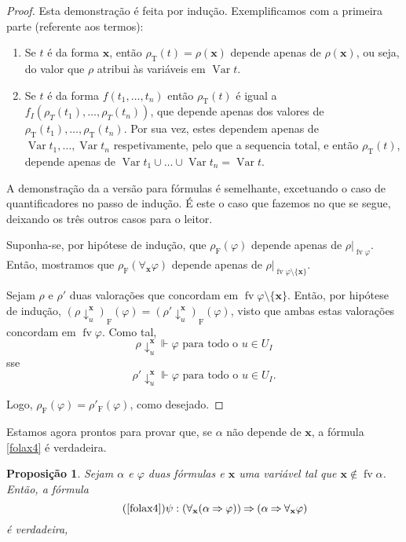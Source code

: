 \documentclass{report}
\newtheorem{prop}{Proposição}
\theoremstyle{definition}
\theoremstyle{remark}
\renewcommand{\bf}[1]{\mathbf{#1}}
\newcommand{\F}{\mathrm{F}}
\newcommand{\T}{\mathrm{T}}
\DeclareMathOperator{\var}{Var}
\DeclareMathOperator{\fv}{fv}
\newcommand{\imply}{\mathbin{\Rightarrow}}
\begin{document}
	\begin{proof}
	Esta demonstração é feita por indução. Exemplificamos com a primeira parte (referente aos termos):
	
	\begin{enumerate}
	\item Se $t$ é da forma $\bf x$, então $\rho_\T(t) = \rho(\bf x)$ depende apenas de $\rho(\bf x)$, ou seja, do valor que $\rho$ atribui às variáveis em $\var t$.
	
	\item Se $t$ é da forma $f(t_1, \dots, t_n)$ então $\rho_\T(t)$ é igual a $f_I(\rho_T(t_1), \dots, \rho_T(t_n))$, que depende apenas dos valores de $\rho_\T(t_1), \dots, \rho_\T(t_n)$. Por sua vez, estes dependem apenas de $\var t_1, \dots, \var t_n$ respetivamente, pelo que a sequencia total, e então $\rho_\T(t)$, depende apenas de $\var t_1 \cup \dots \cup \var t_n = \var t$.
	\end{enumerate}
	
	A demonstração da a versão para fórmulas é semelhante, excetuando o caso de quantificadores no passo de indução. É este o caso que fazemos no que se segue, deixando os três outros casos para o leitor.
	
	Suponha-se, por hipótese de indução, que $\rho_\F(\varphi)$ depende apenas de $\rho|_{\fv \varphi}$. Então, mostramos que $\rho_\F(\forall_{\bf x} \varphi)$ depende apenas de $\rho|_{\fv \varphi \setminus \{\bf x\}}$.
	
	Sejam $\rho$ e $\rho'$ duas valorações que concordam em $\fv \varphi \setminus \{\bf x\}$. Então, por hipótese de indução, $(\rho\!\downarrow^{\bf x}_u)_\F(\varphi) = (\rho'\!\downarrow^{\bf x}_u)_\F(\varphi)$, visto que ambas estas valorações concordam em $\fv \varphi$. Como tal,
	\[\rho\!\downarrow^{\bf x}_u \Vdash \varphi \text{ para todo o $u \in U_I$}\]
	sse
	\[\rho'\!\downarrow^{\bf x}_u \Vdash \varphi \text{ para todo o $u \in U_I$.}\]
	
	Logo, $\rho_\F(\varphi) = \rho'_\F(\varphi)$, como desejado.
	\end{proof}
	
	Estamos agora prontos para provar que, se $\alpha$ não depende de $\bf x$, a fórmula \eqref{folax4} é verdadeira.
	
	\begin{prop}
	Sejam $\alpha$ e $\varphi$ duas fórmulas e $\bf x$ uma variável tal que $\bf x \not \in \fv\alpha$. Então, a fórmula
	\begin{equation}\tag{\ref{folax4}}
	\psi : (\forall_{\bf x} (\alpha \imply \varphi)) \imply (\alpha \imply \forall_{\bf x} \varphi)
	\end{equation}
	é verdadeira,
	\end{prop}
	
\end{document}
